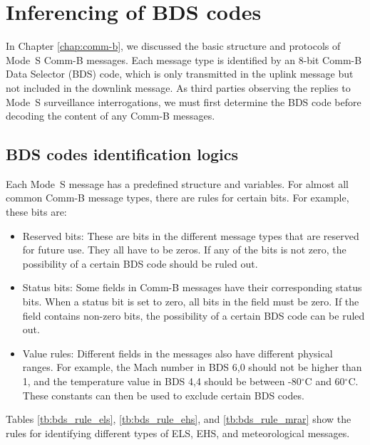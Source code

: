 \chapter{Inferencing of BDS codes} \label{chap:bds_infer}

In Chapter \ref{chap:comm-b}, we discussed the basic structure and protocols of Mode~S Comm-B messages. Each message type is identified by an 8-bit Comm-B Data Selector (BDS) code, which is only transmitted in the uplink message but not included in the downlink message. As third parties observing the replies to Mode~S surveillance interrogations, we must first determine the BDS code before decoding the content of any Comm-B messages. 


\section{BDS codes identification logics}

Each Mode~S message has a predefined structure and variables. For almost all common Comm-B message types, there are rules for certain bits. For example, these bits are:
\begin{itemize}
    \item Reserved bits: These are bits in the different message types that are reserved for future use. They all have to be zeros. If any of the bits is not zero, the possibility of a certain BDS code should be ruled out.
    \item Status bits: Some fields in Comm-B messages have their corresponding status bits. When a status bit is set to zero, all bits in the field must be zero. If the field contains non-zero bits, the possibility of a certain BDS code can be ruled out.
    \item Value rules: Different fields in the messages also have different physical ranges. For example, the Mach number in BDS 6,0 should not be higher than 1, and the temperature value in BDS 4,4 should be between -80$^\circ$C and 60$^\circ$C. These constants can then be used to exclude certain BDS codes.
\end{itemize}


Tables \ref{tb:bds_rule_els}, \ref{tb:bds_rule_ehs}, and \ref{tb:bds_rule_mrar} show the rules for identifying different types of ELS, EHS, and meteorological messages.


